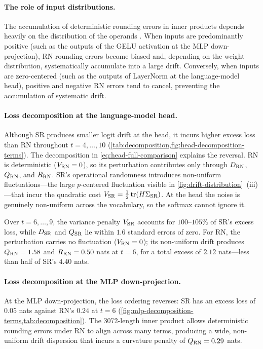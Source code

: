 \paragraph{The role of input distributions.}
The accumulation of deterministic rounding errors in inner products depends heavily on the distribution of the operands \citep{elarar2022error}. When inputs are predominantly positive (such as the outputs of the GELU activation at the MLP down-projection), RN rounding errors become biased and, depending on the weight distribution, systematically accumulate into a large drift. Conversely, when inputs are zero-centered (such as the outputs of LayerNorm at the language-model head), positive and negative RN errors tend to cancel, preventing the accumulation of systematic drift.

\paragraph{Loss decomposition at the language-model head.}
\label{par:head-cost-unbiasedness}
Although SR produces smaller logit drift at the head, it incurs higher excess
loss than RN throughout $t=4,\ldots,10$
(\cref{tab:decomposition,fig:head-decomposition-terms}). The decomposition in
\cref{eq:head-full-comparison} explains the reversal. RN is deterministic
($V_{\mathrm{RN}}=0$), so its perturbation contributes only through $D_{\mathrm{RN}}$,
$Q_{\mathrm{RN}}$, and $R_{\mathrm{RN}}$. SR's operational randomness introduces non-uniform
fluctuations---the large $p$-centered fluctuation visible in
\cref{fig:drift-distribution}~(iii)---that incur the quadratic cost
$V_{\mathrm{SR}}=\tfrac12\operatorname{tr}(H\Sigma_{\mathrm{SR}})$. At the head the noise is
genuinely non-uniform across the vocabulary, so the softmax cannot ignore it.

Over $t=6,\ldots,9$, the variance penalty $V_{\mathrm{SR}}$ accounts for $100$--$105\%$ of SR's
excess loss, while $D_{\mathrm{SR}}$ and $Q_{\mathrm{SR}}$ lie within $1.6$ standard errors of
zero. For RN, the perturbation carries no fluctuation ($V_{\mathrm{RN}}=0$);
its non-uniform drift produces $Q_{\mathrm{RN}}=1.58$ and $R_{\mathrm{RN}}=0.50$
nats at $t=6$, for a total excess of $2.12$ nats---less than half of SR's
$4.40$ nats.

\paragraph{Loss decomposition at the MLP down-projection.}
At the MLP down-projection, the loss ordering reverses:
SR has an excess loss of $0.05$ nats against RN's $0.24$ at $t=6$
(\cref{fig:mlp-decomposition-terms,tab:decomposition}).
The 3072-length inner product allows deterministic rounding errors under RN
to align across many terms, producing a wide, non-uniform drift dispersion
that incurs a curvature penalty of $Q_{\mathrm{RN}}=0.29$ nats.

